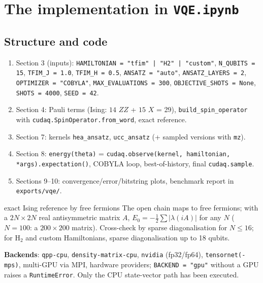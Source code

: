 \documentclass[11pt,a4paper,openany]{book}
\begin{document}
\section{The implementation in \texttt{VQE.ipynb}}
\subsection{Structure and code}
\begin{enumerate}[itemsep=1pt]
\item \sloppy Section 3 (inputs): \texttt{HAMILTONIAN = "tfim" | "H2" | "custom"}, \texttt{N\_QUBITS = 15}, \texttt{TFIM\_J = 1.0}, \texttt{TFIM\_H = 0.5}, \texttt{ANSATZ = "auto"}, \texttt{ANSATZ\_LAYERS = 2},
\texttt{OPTIMIZER = "COBYLA"}, \texttt{MAX\_EVALUATIONS = 300}, \texttt{OBJECTIVE\_SHOTS = None}, \texttt{SHOTS = 4000}, \texttt{SEED = 42}.
\item Section 4: Pauli terms (Ising: $14$ $ZZ$ + $15$ $X$ = 29), \texttt{build\_spin\_operator} with \texttt{cudaq.SpinOperator.from\_word}, exact reference.
\item Section 7: kernels \texttt{hea\_ansatz}, \texttt{ucc\_ansatz} (+ sampled versions with \texttt{mz}).
\item Section 8: \texttt{energy(theta)} = \texttt{cudaq.observe(kernel, hamiltonian, *args).expectation()}, COBYLA loop, best-of-history, final \texttt{cudaq.sample}.
\item Sections 9--10: convergence/error/bitstring plots, benchmark report in \texttt{exports/vqe/}.
\end{enumerate}
\begin{keyres}{exact Ising reference by free fermions}
The open chain maps to free fermions; with a $2N\times2N$ real antisymmetric matrix $A$, $E_0 = -\tfrac12\sum|\lambda(iA)|$ for any $N$ ($N = 100$: a $200\times200$ matrix).
Cross-check by sparse diagonalisation for $N \le 16$; for H$_2$ and custom Hamiltonians, sparse diagonalisation up to 18 qubits.
\end{keyres}
\textbf{Backends}: \texttt{qpp-cpu}, \texttt{density-matrix-cpu}, \texttt{nvidia} (fp32/fp64), \texttt{tensornet(-mps)}, multi-GPU via MPI, hardware providers;
\texttt{BACKEND = "gpu"} without a GPU raises a \texttt{RuntimeError}. Only the CPU state-vector path has been executed.
\end{document}
